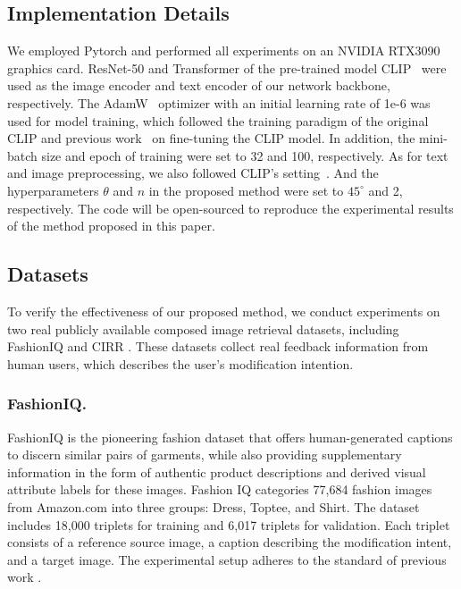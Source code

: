 \documentclass[letterpaper]{article} \usepackage{aaai24}  \usepackage{times}  \usepackage{helvet}  \usepackage{courier}  \usepackage[hyphens]{url}  \usepackage{graphicx} \urlstyle{rm} \def\UrlFont{\rm}  \usepackage{natbib}  \usepackage{caption} \frenchspacing  \setlength{\pdfpagewidth}{8.5in} \setlength{\pdfpageheight}{11in} \usepackage{amsmath,amsfonts}
\begin{document}
\subsection{Implementation Details}
We employed Pytorch and performed all experiments on an NVIDIA RTX3090 graphics card. ResNet-50 and Transformer of the pre-trained model CLIP~\cite{Radford2021CLIP} were used as the image encoder and text encoder of our network backbone, respectively. The AdamW~\cite{Kingma2015adam} optimizer with an initial learning rate of 1e-6 was used for model training, which followed the training paradigm of the original CLIP and previous work~\cite{CLIP4Cir} on fine-tuning the CLIP model. In addition, the mini-batch size and epoch of training were set to 32 and 100, respectively. As for text and image preprocessing, we also followed CLIP's setting~\cite{Radford2021CLIP}. And the hyperparameters $\theta$ and $n$ in the proposed method were set to $45^\circ$ and 2, respectively. The code will be open-sourced to reproduce the experimental results of the method proposed in this paper.

\subsection{Datasets}
To verify the effectiveness of our proposed method, we conduct experiments on two real publicly available composed image retrieval datasets, including FashionIQ \cite{guo2019fashion} and CIRR \cite{liu2021image}. These datasets collect real feedback information from human users, which describes the user's modification intention.

\subsubsection{FashionIQ.}
FashionIQ \cite{guo2019fashion} is the pioneering fashion dataset that offers human-generated captions to discern similar pairs of garments, while also providing supplementary information in the form of authentic product descriptions and derived visual attribute labels for these images. Fashion IQ categories 77,684 fashion images from Amazon.com into three groups: Dress, Toptee, and Shirt. The dataset includes 18,000 triplets for training and 6,017 triplets for validation. Each triplet consists of a reference source image, a caption describing the modification intent, and a target image. The experimental setup adheres to the standard of previous work \cite{Chen_2020_CVPR, 2021CoSMo, CLIP4Cir, chen2022composed}.
\end{document}
